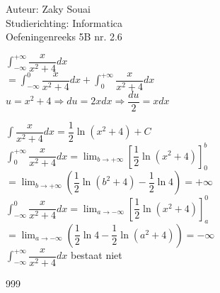 \documentclass[a4paper]{article}
\begin{document}
  
\noindent \large Auteur: Zaky Souai \\
\noindent \large Studierichting:  Informatica\\
\noindent \large Oefeningenreeks 5B nr. 2.6\\

\bigskip

\normalsize

$\displaystyle\int_{-\infty}^{+\infty}\dfrac{x}{x^2+4}dx$\\

$=\displaystyle\int_{-\infty}^{0}\dfrac{x}{x^2+4}dx+ \displaystyle \int_{0}^{+\infty}\dfrac{x}{x^2+4}dx$\\

$u=x^2+4 \Rightarrow du=2xdx \Rightarrow \dfrac{du}{2} = xdx$

$\displaystyle\int\dfrac{x}{x^2+4}dx=\dfrac{1}{2}\ln(x^2+4) + C$\\

$\displaystyle\int_{0}^{+\infty}\dfrac{x}{x^2+4}dx=\lim_{b\to+\infty}\left[\dfrac{1}{2}\ln(x^2+4)\right]_{0}^{b}$\\

$=\lim_{b\to+\infty}\left(\dfrac{1}{2}\ln(b^2+4)-\dfrac{1}{2}\ln4\right) =+\infty$\\

$\displaystyle\int_{-\infty}^{0}\dfrac{x}{x^2+4}dx=\lim_{a\to-\infty}\left[\dfrac{1}{2}\ln(x^2+4)\right]_{a}^{0}$\\

$=\lim_{a\to-\infty}\left(\dfrac{1}{2}\ln4-\dfrac{1}{2}\ln(a^2+4)\right) =-\infty$\\

$\displaystyle\int_{-\infty}^{+\infty}\dfrac{x}{x^2+4}dx$ bestaat niet\\

\begin{thebibliography}{999}
\end{thebibliography}
\end{document}
